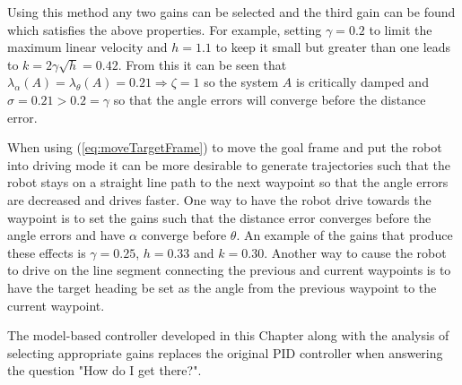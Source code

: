 Using this method any two gains can be selected and the third gain can be found which satisfies the above properties. For example, setting $\gamma=0.2$ to limit the maximum linear velocity and $h=1.1$ to keep it small but greater than one leads to $k=2\gamma\sqrt{h}=0.42$. From this it can be seen that $\lambda_\alpha(A) = \lambda_\theta(A) = 0.21 \Rightarrow \zeta = 1$ so the system $A$ is critically damped and $\sigma = 0.21>0.2=\gamma$ so that the angle errors will converge before the distance error.

When using (\ref{eq:moveTargetFrame}) to move the goal frame and put the robot into driving mode it can be more desirable to generate trajectories such that the robot stays on a straight line path to the next waypoint so that the angle errors are decreased and drives faster. One way to have the robot drive towards the waypoint is to set the gains such that the distance error converges before the angle errors and have $\alpha$ converge before $\theta$. An example of the gains that produce these effects is $\gamma=0.25$, $h=0.33$ and $k=0.30$. Another way to cause the robot to drive on the line segment connecting the previous and current waypoints is to have the target heading be set as the angle from the previous waypoint to the current waypoint.

The model-based controller developed in this Chapter along with the analysis of selecting appropriate gains replaces the original PID controller when answering the question "How do I get there?".
